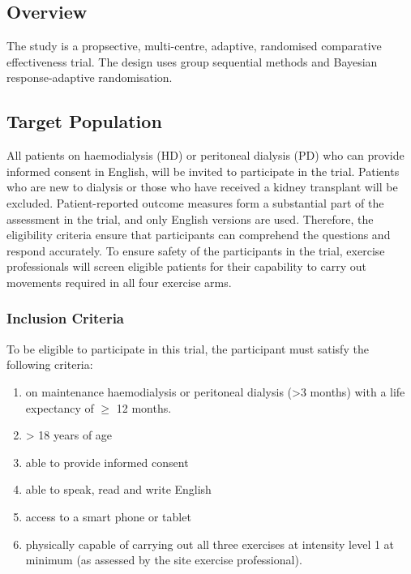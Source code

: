 \documentclass[
]{article}
\providecommand{\tightlist}{%
  \setlength{\itemsep}{0pt}\setlength{\parskip}{0pt}}
\begin{document}
\hypertarget{overview}{
  \subsection{Overview}\label{overview}}

The study is a propsective, multi-centre, adaptive, randomised comparative effectiveness trial.
The design uses group sequential methods and Bayesian response-adaptive randomisation.


\hypertarget{target-population}{%
  \subsection{Target Population}\label{target-population}}

All patients on haemodialysis (HD) or peritoneal dialysis (PD) who can provide informed consent in English, will be invited to participate in the trial.
Patients who are new to dialysis or those who have received a kidney transplant will be excluded.
Patient-reported outcome measures form a substantial part of the assessment in the trial, and only English versions are used.
Therefore, the eligibility criteria ensure that participants can comprehend the questions and respond accurately.
To ensure safety of the participants in the trial, exercise professionals will screen eligible patients for their capability to carry out movements required in all four exercise arms.

\hypertarget{inclusion-criteria}{
  \subsubsection{Inclusion Criteria}\label{inclusion-criteria}
}

To be eligible to participate in this trial, the participant must satisfy the following criteria:

\begin{enumerate}
  \def\labelenumi{\arabic{enumi}.}
  \tightlist
  \item on maintenance haemodialysis or peritoneal dialysis (>3 months) with a life expectancy of $\ge$ 12 months.
  \item > 18 years of age
  \item able to provide informed consent
  \item able to speak, read and write English
  \item access to a smart phone or tablet
  \item physically capable of carrying out all three exercises at intensity level 1 at minimum (as assessed by the site exercise professional).
\end{enumerate}
\end{document}
